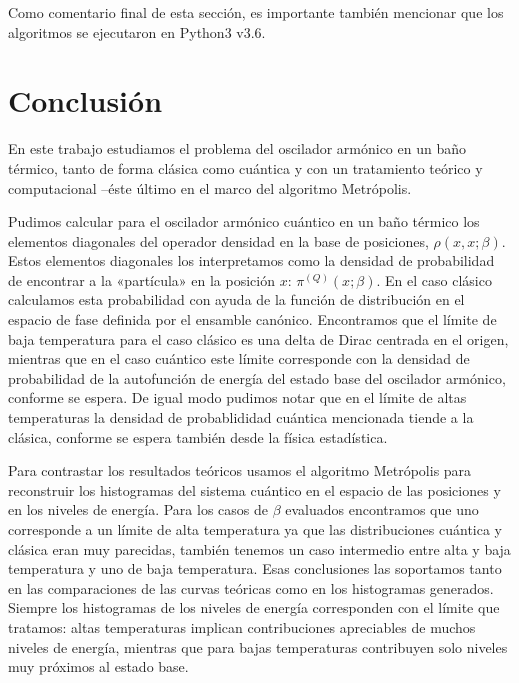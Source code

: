 \documentclass[%
 reprint,
 amsmath,amssymb,
 aps,
 pra,
]{revtex4-2}
\begin{document}
\begin{figure*}[!ht]
	\centering
	\texttt{[image: \{\{figures/pi\_x-pi-plots-anharmonic\_potential-beta\_4.000-N\_path\_10-N\_iter\_1000000-delta\_0.500-append\_every\_1-x\_max\_3.000]}}}
	\caption{\hl{caption}}
	\label{fig:path-int-anharm}
\end{figure*}



Como comentario final de esta sección, es importante también mencionar que los algoritmos se ejecutaron en Python3 v3.6.

\section{Conclusión\label{sec:conclusion}}

En este trabajo estudiamos el problema del oscilador armónico en un baño térmico, tanto de forma clásica como cuántica y con un tratamiento teórico y computacional –éste último en el marco del algoritmo Metrópolis.

Pudimos calcular para el oscilador armónico cuántico en un baño térmico los elementos diagonales del operador densidad en la base de posiciones, $\rho(x,x;\beta)$. Estos elementos diagonales los interpretamos como la densidad de probabilidad de encontrar a la «partícula» en la posición $x$: $\pi^{(Q)}(x;\beta)$. En el caso clásico calculamos esta probabilidad con ayuda de la función de distribución en el espacio de fase definida por el ensamble canónico. Encontramos que el límite de baja temperatura para el caso clásico es una delta de Dirac centrada en el origen, mientras que en el caso cuántico este límite corresponde con la densidad de probabilidad de la autofunción de energía del estado base del oscilador armónico, conforme se espera. De igual modo pudimos notar que en el límite de altas temperaturas la densidad de probablididad cuántica mencionada tiende a la clásica, conforme se espera también desde la física estadística. 

Para contrastar los resultados teóricos usamos el algoritmo Metrópolis para reconstruir los histogramas del sistema cuántico en el espacio de las posiciones y en los niveles de energía. Para los casos de $\beta$ evaluados encontramos que uno corresponde a un límite de alta temperatura ya que las distribuciones cuántica y clásica eran muy parecidas, también tenemos un caso intermedio entre alta y baja temperatura y uno de baja temperatura. Esas conclusiones las soportamos tanto en las comparaciones de las curvas teóricas como en los histogramas generados. Siempre los histogramas de los niveles de energía corresponden con el límite que tratamos: altas temperaturas implican contribuciones apreciables de muchos niveles de energía, mientras que para bajas temperaturas contribuyen solo niveles muy próximos al estado base.
\end{document}
